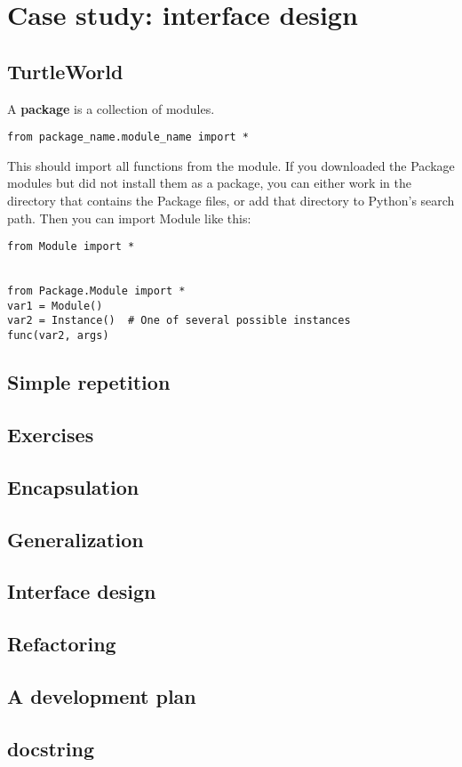 \documentclass{article}
\begin{document}
\section{Case study: interface design}
\subsection{TurtleWorld}
A \textbf{package} is a collection of modules.
\begin{verbatim}
from package_name.module_name import *
\end{verbatim}
This should import all functions from the module.
If you downloaded the Package modules but did not install them as a package, you
can either work in the directory that contains the Package files, or add that
directory to Python’s search path. Then you can import Module like this:
\begin{verbatim}
from Module import *


from Package.Module import *
var1 = Module()
var2 = Instance()  # One of several possible instances
func(var2, args)
\end{verbatim}
\subsection{Simple repetition}
\subsection{Exercises}
\subsection{Encapsulation}
\subsection{Generalization}
\subsection{Interface design}
\subsection{Refactoring}
\subsection{A development plan}
\subsection{docstring}
\end{document}
